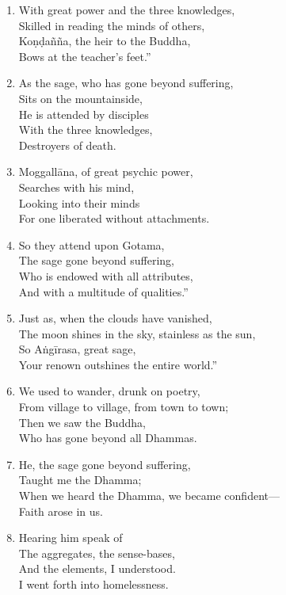 \documentclass[10pt, openany]{book}
\newcommand*{\vleftofline}[1]{\leavevmode\llap{#1}}
\begin{document}
\begin{enumerate}
\item With great power and the three knowledges,\\
Skilled in reading the minds of others,\\
Koṇḍañña, the heir to the Buddha,\\
Bows at the teacher’s feet.”

\item \vleftofline{“}As the sage, who has gone beyond suffering,\\
Sits on the mountainside,\\
He is attended by disciples \\
With the three knowledges,\\
Destroyers of death.

\item Moggallāna, of great psychic power,\\
Searches with his mind,\\
Looking into their minds\\
For one liberated without attachments.

\item So they attend upon Gotama,\\
The sage gone beyond suffering,\\
Who is endowed with all attributes,\\
And with a multitude of qualities.”

\item \vleftofline{“}Just as, when the clouds have vanished,\\
The moon shines in the sky, stainless as the sun,\\
So Aṅgīrasa, great sage,\\
Your renown outshines the entire world.”

\item \vleftofline{“}We used to wander, drunk on poetry,\\
From village to village, from town to town;\\
Then we saw the Buddha,\\
Who has gone beyond all Dhammas.

\item He, the sage gone beyond suffering,\\
Taught me the Dhamma;\\
When we heard the Dhamma, we became confident—\\
Faith arose in us.

\item Hearing him speak of\\
The aggregates, the sense-bases,\\
And the elements, I understood.\\
I went forth into homelessness.


\end{enumerate}
\end{document}
